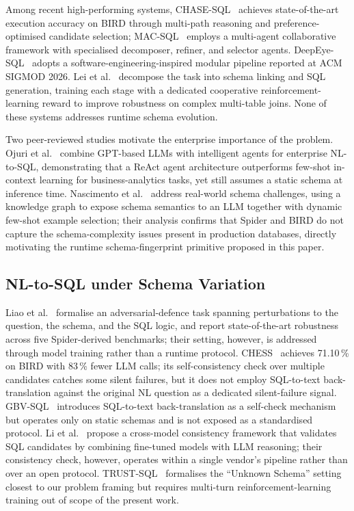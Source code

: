 \documentclass[conference,10pt,a4paper]{IEEEtran}
\begin{document}
Among recent high-performing systems, CHASE-SQL~\cite{pourreza2025chasesql}
achieves state-of-the-art execution accuracy on BIRD through multi-path
reasoning and preference-optimised candidate selection;
MAC-SQL~\cite{wang2025macsql} employs a multi-agent collaborative
framework with specialised decomposer, refiner, and selector agents.
DeepEye-SQL~\cite{li2026deepeyesql} adopts a software-engineering-inspired
modular pipeline reported at ACM SIGMOD 2026.
Lei et al.~\cite{lei2026crl} decompose the task into schema linking and
SQL generation, training each stage with a dedicated cooperative
reinforcement-learning reward to improve robustness on complex
multi-table joins.
None of these systems addresses runtime schema evolution.

Two peer-reviewed studies motivate the enterprise importance of the
problem. Ojuri et al.~\cite{ojuri2025agents} combine GPT-based LLMs
with intelligent agents for enterprise NL-to-SQL,
demonstrating that a ReAct agent architecture outperforms few-shot
in-context learning for business-analytics tasks, yet still assumes a
static schema at inference time. Nascimento et
al.~\cite{nascimento2026kgsql} address real-world schema challenges,
using a knowledge graph to expose schema semantics to an LLM together with
dynamic few-shot example selection; their analysis confirms that Spider
and BIRD do not capture the schema-complexity issues present in
production databases, directly motivating the runtime schema-fingerprint
primitive proposed in this paper.

\subsection{NL-to-SQL under Schema Variation}
Liao et al.~\cite{liao2026infosql} formalise an adversarial-defence task
spanning perturbations to the question, the schema, and the SQL logic,
and report state-of-the-art robustness across five Spider-derived
benchmarks; their setting, however, is addressed through model training
rather than a runtime protocol.
CHESS~\cite{talaei2024chess} achieves 71.10\,\% on
BIRD with 83\,\% fewer LLM calls; its self-consistency check over
multiple candidates catches some silent failures, but it does not
employ SQL-to-text back-translation against the original NL question
as a dedicated silent-failure signal.
GBV-SQL~\cite{chen2025gbvsql} introduces SQL-to-text back-translation as
a self-check mechanism but operates only on static schemas and is not
exposed as a standardised protocol.
Li et al.~\cite{li2025cmsql} propose a cross-model consistency framework
that validates SQL candidates by combining fine-tuned models with LLM
reasoning; their consistency check, however, operates within a
single vendor's pipeline rather than over an open protocol.
TRUST-SQL~\cite{jian2026trustsql}
formalises the ``Unknown Schema'' setting closest to our problem framing
but requires multi-turn reinforcement-learning training out of scope of
the present work.
\end{document}
